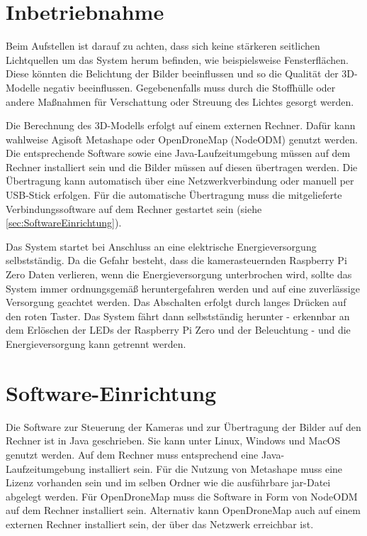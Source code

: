 \documentclass[./00PhotoBox.tex]{subfiles}
\begin{document}
\section{Inbetriebnahme}
Beim Aufstellen ist darauf zu achten, dass sich keine stärkeren seitlichen Lichtquellen um das System herum befinden, wie beispielsweise Fensterflächen. Diese könnten die Belichtung der Bilder beeinflussen und so die Qualität der 3D-Modelle negativ beeinflussen. Gegebenenfalls muss durch die Stoffhülle oder andere Maßnahmen für Verschattung oder Streuung des Lichtes gesorgt werden.

Die Berechnung des 3D-Modells erfolgt auf einem externen Rechner. Dafür kann wahlweise Agisoft Metashape oder OpenDroneMap (NodeODM) genutzt werden. Die entsprechende Software sowie eine Java-Laufzeitumgebung müssen auf dem Rechner installiert sein und die Bilder müssen auf diesen übertragen werden. Die Übertragung kann au\-to\-ma\-tisch über eine Netzwerkverbindung oder manuell per USB-Stick erfolgen. Für die au\-to\-ma\-tische Übertragung muss die mitgelieferte Verbindungssoftware auf dem Rechner gestartet sein (siehe \autoref{sec:SoftwareEinrichtung}).

Das System startet bei Anschluss an eine elektrische Energieversorgung selbstständig. Da die Gefahr besteht, dass die kamerasteuernden Raspberry Pi Zero Daten verlieren, wenn die Energieversorgung unterbrochen wird, sollte das System immer ordnungsgemäß heruntergefahren werden und auf eine zuverlässige Versorgung geachtet werden.
Das Abschalten erfolgt durch langes Drücken auf den roten Taster. Das System fährt dann selbstständig herunter - erkennbar an dem Erlöschen der LEDs der Raspberry Pi Zero und der Beleuchtung - und die Energieversorgung kann getrennt werden.

\section{Software-Einrichtung}
\label{sec:SoftwareEinrichtung}
Die Software zur Steuerung der Kameras und zur Übertragung der Bilder auf den Rechner ist in Java geschrieben. Sie kann unter Linux, Windows und MacOS genutzt werden. Auf dem Rechner muss entsprechend eine Java-Laufzeitumgebung installiert sein. Für die Nutzung von Metashape muss eine Lizenz vorhanden sein und im selben Ordner wie die ausführbare jar-Datei abgelegt werden. Für OpenDroneMap muss die Software in Form von NodeODM auf dem Rechner installiert sein. Alternativ kann OpenDroneMap auch auf einem externen Rechner installiert sein, der über das Netzwerk erreichbar ist.
\end{document}

